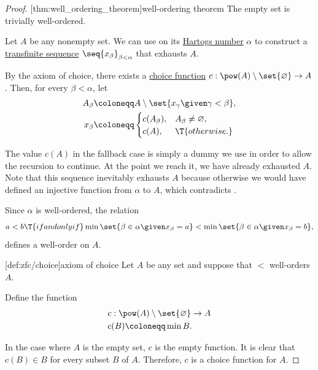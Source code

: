 \begin{proof}
  [thm:well_ordering_theorem]{well-ordering theorem} The empty set is trivially well-ordered.

  Let \( A \) be any nonempty set. We can use  on its \hyperref[def:hartogs_number]{Hartogs number} \( \alpha \) to construct a \hyperref[def:transfinite_sequence]{transfinite sequence} \( \seq{ x_\beta }_{\beta < \alpha} \) that exhausts \( A \).

  By the axiom of choice, there exists a \hyperref[def:choice_function]{choice function} \( c: \pow(A) \setminus \set{ \varnothing } \to A \). Then, for every \( \beta < \alpha \), let
  \begin{align*}
    A_\beta &\coloneqq A \setminus \set{ x_\gamma \given \gamma < \beta }, \\
    x_\beta &\coloneqq \begin{cases}
     c(A_\beta), &A_\beta \neq \varnothing, \\
     c(A),       &\T{otherwise.} \\
    \end{cases}
  \end{align*}

  The value \( c(A) \) in the fallback case is simply a dummy we use in order to allow the recursion to continue. At the point we reach it, we have already exhausted \( A \). Note that this sequence inevitably exhausts \( A \) because otherwise we would have defined an injective function from \( \alpha \) to \( A \), which contradicts .

  Since \( \alpha \) is well-ordered, the relation
  \begin{equation*}
    a < b \T{if and only if} \min\set{ \beta \in \alpha \given x_\beta = a } < \min\set{ \beta \in \alpha \given x_\beta = b },
  \end{equation*}
  defines a well-order on \( A \).

  [def:zfc/choice]{axiom of choice} Let \( A \) be any set and suppose that \( < \) well-orders \( A \).

  Define the function
  \begin{equation*}
    \begin{aligned}
      &c: \pow(A) \setminus \set{ \varnothing } \to A \\
      &c(B) \coloneqq \min B.
    \end{aligned}
  \end{equation*}

  In the case where \( A \) is the empty set, \( c \) is the empty function. It is clear that \( c(B) \in B \) for every subset \( B \) of \( A \). Therefore, \( c \) is a choice function for \( A \).
\end{proof}
